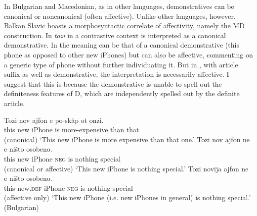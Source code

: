 \documentclass[output=paper,
colorlinks,
citecolor=brown,
newtxmath
]{langscibook}
\begin{document}
In Bulgarian and Macedonian, as in other languages, demonstratives can be canonical or noncanonical (often affective). Unlike other languages, however, Balkan Slavic boasts a morphosyntactic correlate of affectivity, namely the MD construction. In  \textit{tozi} in a contrastive context is interpreted as a canonical demonstrative. In  the meaning can be that of a canonical demonstrative (this phone as opposed to other new iPhones) but can also be affective, commenting on a generic type of phone without further individuating it. But in , with article suffix as well as demonstrative, the interpretation is necessarily affective. I suggest that this is because the demonstrative is unable to spell out the definiteness features of D, which are independently spelled out by the definite article.

\ea \label{iphone} \ea \label{phone1}
\gll Tozi nov ajfon e po-skăp ot onzi. \\
this new iPhone is more-expensive than that \\\hfill (canonical)
\glt `This new iPhone is more expensive than that one.'
\ex \label{phone2}
\gll Tozi nov ajfon ne e ništo osobeno.\\
 this new iPhone \textsc{neg} is nothing special \\\hfill (canonical or affective)
 \glt `This new iPhone is nothing special.'
 \ex \label{phone3}
 \gll Tozi novija ajfon ne e ništo osobeno.\\
 this new.\textsc{def} iPhone \textsc{neg} is nothing special \\\hfill (affective only)
 \glt `This new iPhone (i.e. new iPhones in general) is nothing special.'
 \glt \hfill (Bulgarian)
\z \z
\end{document}
